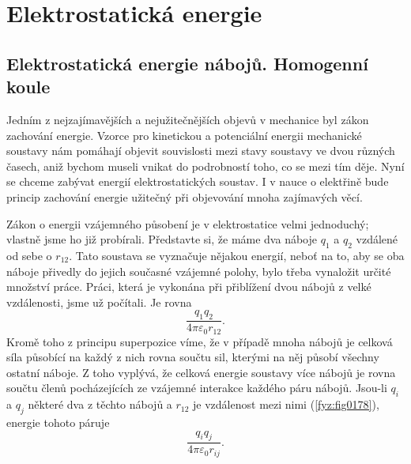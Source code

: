 \setchaptertoc
\chapter{Elektrostatická energie}\label{fyz:IIchapVI}
  \section{Elektrostatická energie nábojů. Homogenní koule}\label{fyz:IIchapVIsecI}
    Jedním z nejzajímavějších a nejužitečnějších objevů v mechanice byl zákon zachování energie.
    Vzorce pro kinetickou a potenciální energii mechanické soustavy nám pomáhají objevit souvislosti
    mezi stavy soustavy ve dvou různých časech, aniž bychom museli vnikat do podrobností toho, co se
    mezi tím děje. Nyní se chceme zabývat energií elektrostatických soustav. I v nauce o elektřině
    bude princip zachování energie užitečný při objevování mnoha zajímavých věcí.

    Zákon o energii vzájemného působení je v elektrostatice velmi jednoduchý; vlastně jsme ho již
    probírali. Představte si, že máme dva náboje \(q_1\) a \(q_2\) vzdálené od sebe o \(r_{12}\).
    Tato soustava se vyznačuje nějakou energií, neboť na to, aby se oba náboje přivedly do jejich
    současné vzájemné polohy, bylo třeba vynaložit určité množství práce. Práci, která je vykonána
    při přiblížení dvou nábojů z velké vzdálenosti, jsme už počítali. Je rovna
    \begin{equation}\label{fyz:eq868}
      \dfrac{q_1q_2}{4π\varepsilon_0r_{12}}.      
    \end{equation}
    Kromě toho z principu superpozice víme, že v případě mnoha nábojů je celková síla působící na
    každý z nich rovna součtu sil, kterými na něj působí všechny ostatní náboje. Z toho vyplývá, že
    celková energie soustavy více nábojů je rovna součtu členů pocházejících ze vzájemné interakce
    každého páru nábojů. Jsou-li \(q_i\) a \(q_j\) některé dva z těchto nábojů a \(r_{12}\) je
    vzdálenost mezi nimi (\ref{fyz:fig0178}), energie tohoto páruje
    \begin{equation}\label{fyz:eq869}
      \dfrac{q_iq_j}{4π\varepsilon_0r_{ij}}.      
    \end{equation}


